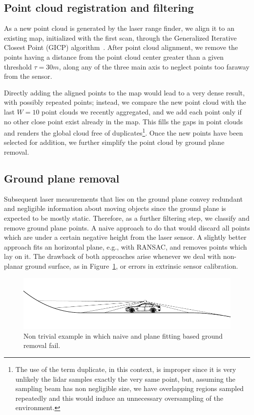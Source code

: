 \subsection{Point cloud registration and filtering}
As a new point cloud is generated by the laser range finder, we align it to an existing map, initialized with the first scan, through the Generalized Iterative Closest Point (GICP) algorithm~\cite{segal2009generalized}.
%
After point cloud alignment, we remove the points having a distance from the point cloud center greater than a given threshold $\tau = 30m$, along any of the three main axis to neglect points too faraway from the sensor.

Directly adding the aligned points to the map would lead to a very dense result, with possibly repeated points; instead, we compare the new point cloud with the last $W = 10$ 
point clouds we recently aggregated, and we add each point only if no other close point exist already in the map. This fills the gaps in point clouds and renders the global cloud free of duplicates\footnote{The use of the term duplicate, in this context, is improper since it is very unlikely the lidar samples exactly the very same point, but, assuming the sampling beam has non negligible size, we have overlapping regions sampled repeatedly and this would induce an unnecessary oversampling of the environment.}. Once the new points have been selected for addition, we further simplify the point cloud by ground plane removal.


\subsection{Ground plane removal}
\label{sec:ground_removal}
Subsequent laser measurements that lies on the ground plane convey redundant and negligible information about moving objects since the ground plane is expected to be mostly static. Therefore, as a further filtering step, we classify and remove ground plane points. 
A naive approach to do that would discard all points which are under a certain negative height from the laser sensor. 
A slightly better approach fits an horizontal plane, e.g., with RANSAC, and removes points which lay on it.
The drawback of both approaches arise whenever we deal with non-planar ground surface, as in Figure~\ref{fig:nonplane}, or errors in extrinsic sensor calibration.

\begin{figure}
\includegraphics[width=\columnwidth]{./img/ch-laser/./non-plane}
\caption{Non trivial example in which naive and plane fitting based ground removal fail.}
\label{fig:nonplane}
\end{figure}

